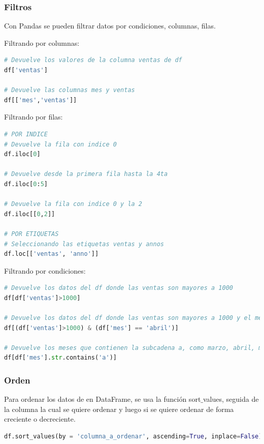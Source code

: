\documentclass[a4paper, 12pt]{book}
\begin{document}
\subsubsection{Filtros}
Con Pandas se pueden filtrar datos por condiciones, columnas, filas.


Filtrando por columnas:
\begin{lstlisting}[language=Python]
# Devuelve los valores de la columna ventas de df
df['ventas']
	
# Devuelve las columnas mes y ventas
df[['mes','ventas']]
\end{lstlisting}

Filtrando por filas:
\begin{lstlisting}[language=Python]
# POR INDICE
# Devuelve la fila con indice 0
df.iloc[0]
	
# Devuelve desde la primera fila hasta la 4ta
df.iloc[0:5]
	
# Devuelve la fila con indice 0 y la 2
df.iloc[[0,2]]
	
# POR ETIQUETAS
# Seleccionando las etiquetas ventas y annos
df.loc[['ventas', 'anno']]
\end{lstlisting}

Filtrando por condiciones:
\begin{lstlisting}[language=Python]
# Devuelve los datos del df donde las ventas son mayores a 1000
df[df['ventas']>1000]
	
# Devuelve los datos del df donde las ventas son mayores a 1000 y el mes es igual a abril
df[(df['ventas']>1000) & (df['mes'] == 'abril')]
	
# Devuelve los meses que contienen la subcadena a, como marzo, abril, mayo, agosto
df[df['mes'].str.contains('a')]
\end{lstlisting}

\subsubsection{Orden}
Para ordenar los datos de en DataFrame, se usa la función sort$\_$values, seguida de la columna la cual se quiere ordenar y luego si se quiere ordenar de forma creciente o decreciente.
\begin{lstlisting}[language=Python]
df.sort_values(by = 'columna_a_ordenar', ascending=True, inplace=False)
\end{lstlisting}

\end{document}
